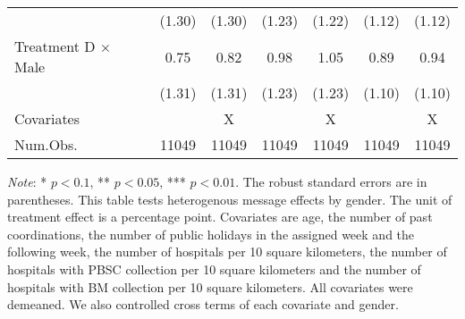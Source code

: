 \documentclass[12pt, a4paper]{article}
\begin{document}
\begin{table}[H]
\begin{threeparttable}
\begin{tabular}[t]{lcccccc}
 & (\num{1.30}) & (\num{1.30}) & (\num{1.23}) & (\num{1.22}) & (\num{1.12}) & (\num{1.12})\\
Treatment D $\times$ Male & \num{0.75} & \num{0.82} & \num{0.98} & \num{1.05} & \num{0.89} & \num{0.94}\\
 & (\num{1.31}) & (\num{1.31}) & (\num{1.23}) & (\num{1.23}) & (\num{1.10}) & (\num{1.10})\\
\midrule
Covariates &  & X &  & X &  & X\\
Num.Obs. & \num{11049} & \num{11049} & \num{11049} & \num{11049} & \num{11049} & \num{11049}\\
\bottomrule
\end{tabular}
\begin{tablenotes}
\item \emph{Note}: * $p < 0.1$, ** $p < 0.05$, *** $p < 0.01$. The robust standard errors are in parentheses. This table tests heterogenous message effects by gender. The unit of treatment effect is a percentage point. Covariates are age, the number of past coordinations, the number of public holidays in the assigned week and the following week, the number of hospitals per 10 square kilometers, the number of hospitals with PBSC collection per 10 square kilometers and the number of hospitals with BM collection per 10 square kilometers. All covariates were demeaned. We also controlled cross terms of each covariate and gender.
\end{tablenotes}
\end{threeparttable}
\end{table}
\end{document}
